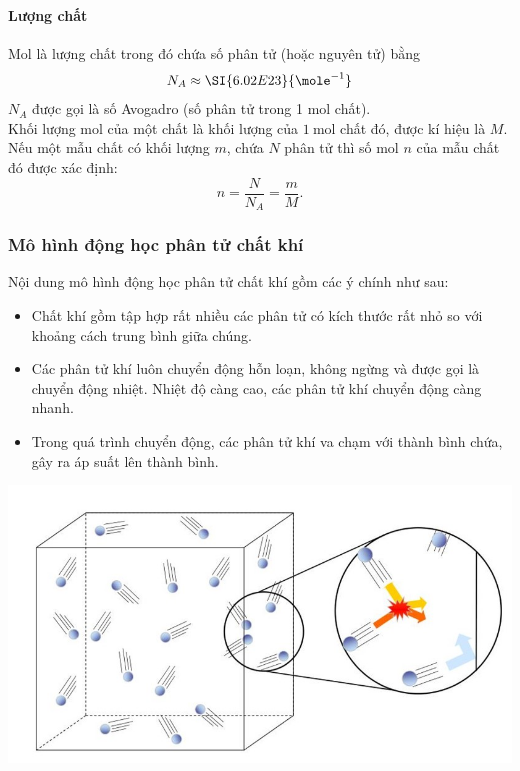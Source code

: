 \paragraph{Lượng chất}
\begin{boxdn}
	Mol là lượng chất trong đó chứa số phân tử (hoặc nguyên tử) bằng 
	$$N_A\approx\SI{6.02E23}{\mole^{-1}}$$
	$N_A$ được gọi là số Avogadro (số phân tử trong 1 mol chất).\\
	Khối lượng mol của một chất là khối lượng của $\SI{1}{\mole}$ chất đó, được kí hiệu là $M$.\\
	Nếu một mẫu chất có khối lượng $m$, chứa $N$ phân tử thì số mol $n$ của mẫu chất đó được xác định:
	$$n=\dfrac{N}{N_A}=\dfrac{m}{M}.$$
\end{boxdn}
\subsubsection{Mô hình động học phân tử chất khí}
\begin{boxdn}
	Nội dung mô hình động học phân tử chất khí gồm các ý chính như sau:
	\begin{itemize}
		\item Chất khí gồm tập hợp rất nhiều các phân tử có kích thước rất nhỏ so với khoảng cách trung bình giữa chúng.
		\item Các phân tử khí luôn chuyển động hỗn loạn, không ngừng và được gọi là chuyển động nhiệt. Nhiệt độ càng cao, các phân tử khí chuyển động càng nhanh.
		\item Trong quá trình chuyển động, các phân tử khí va chạm với thành bình chứa, gây ra áp suất lên thành bình.
	\end{itemize}
\end{boxdn}
\begin{center}
	\includegraphics[width=0.4\linewidth]{figs/VN12-Y24-PH-SYL-009-2}
\end{center}
